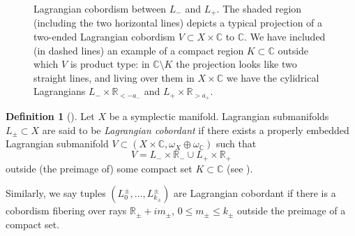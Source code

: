 \documentclass[10pt]{amsart}
\theoremstyle{definition}
\newtheorem{defn}[thm]{Definition}
\theoremstyle{remark}
\def\C{\mathbb{C}}
\def\R{\mathbb{R}}
\def\x{\times}
\begin{document}
\begin{figure}[b]
    \centering
    \caption{Lagrangian cobordism between $L_-$ and $L_+$. The shaded region (including the two horizontal lines) depicts a typical projection of a two-ended Lagrangian cobordism $V \subset X \x \C$ to $\C$. We have included (in dashed lines) an example of a compact region $K \subset\C$ outside which $V$ is product type: in $\C \setminus K$ the projection looks like two straight lines, and living over them in $X \x \C$ we have the cylidrical Lagrangians $L_- \x \R_{<-a_-}$ and $L_+ \x \R_{>a_+}$.}
    \label{fig:lagcob}
\end{figure}


\begin{defn}[\cite{arnol1980lagrange,arnol1980lagrange2}]\label{defn:lagrangian_cobordism}
    Let $X$ be a symplectic manifold.
    Lagrangian submanifolds $L_\pm \subset X$ are said to be \emph{Lagrangian cobordant} if there exists a properly embedded Lagrangian submanifold $V \subset (X \x \C, \omega_X \oplus \omega_\C)$ such that
    \begin{equation*}
        V  = L_- \x \R_- \cup L_+ \x \R_+
    \end{equation*}
    outside (the preimage of) some compact set $K \subset \C$ (see ).

    Similarly, we say tuples $(L_0^\pm,\dots, L_{k_\pm}^\pm)$ are Lagrangian cobordant if there is a cobordism fibering over rays $\R_\pm + i m_\pm$, $0\leq m_\pm \leq k_\pm$ outside the preimage of a compact set.
\end{defn}
\end{document}
